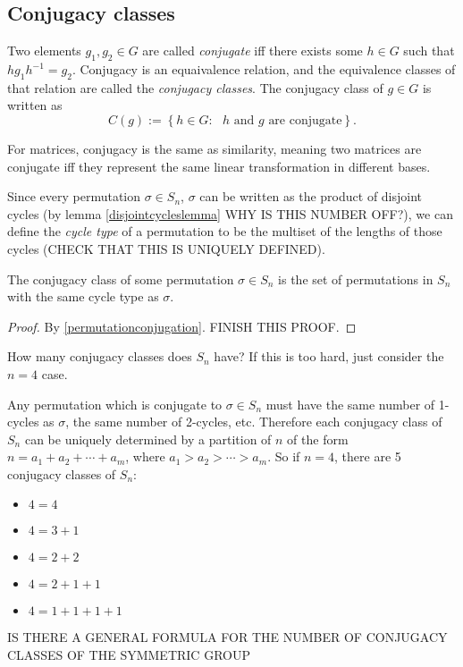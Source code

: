 \documentclass[class=article, crop=false]{standalone}
\begin{document}
\subsection{Conjugacy classes}
Two elements $g_1, g_2 \in G$ are called \emph{conjugate} iff there exists some $h \in G$ such that $hg_1h^{-1}=g_2$. Conjugacy is an equaivalence relation, and the equivalence classes of that relation are called the \emph{conjugacy classes}. The conjugacy class of $g \in G$ is written as
\[ C(g) := \left\{ h \in G: \text{ $h$ and $g$ are conjugate} \right\}. \]
\par
For matrices, conjugacy is the same as similarity, meaning two matrices are conjugate iff they represent the same linear transformation in different bases.
\par
Since every permutation $\sigma \in S_n$, $\sigma$ can be written as the product of disjoint cycles (by lemma \ref{disjointcycleslemma} WHY IS THIS NUMBER OFF?), we can define the \emph{cycle type} of a permutation to be the multiset of the lengths of those cycles (CHECK THAT THIS IS UNIQUELY DEFINED).
\begin{thm}
    The conjugacy class of some permutation $\sigma \in S_n$ is the set of permutations in $S_n$ with the same cycle type as $\sigma$.
\end{thm}
\begin{proof}
    By \ref{permutationconjugation}. FINISH THIS PROOF.
\end{proof}
\begin{prob}
    How many conjugacy classes does $S_n$ have? If this is too hard, just consider the $n=4$ case.
\end{prob}
Any permutation which is conjugate to $\sigma \in S_n$ must have the same number of 1-cycles as $\sigma$, the same number of 2-cycles, etc. Therefore each conjugacy class of $S_n$ can be uniquely determined by a partition of $n$ of the form $n=a_1+a_2+\cdots+a_m$, where $a_1>a_2>\cdots>a_m$. So if $n=4$, there are 5 conjugacy classes of $S_n$:
\begin{itemize}
    \item $4=4$
    \item $4=3+1$
    \item $4=2+2$
    \item $4=2+1+1$
    \item $4=1+1+1+1$
\end{itemize}
IS THERE A GENERAL FORMULA FOR THE NUMBER OF CONJUGACY CLASSES OF THE SYMMETRIC GROUP
\end{document}
